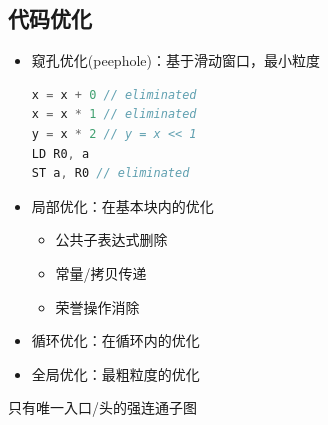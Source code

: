 \subsection{代码优化}
\begin{itemize}
	\item 窥孔优化(peephole)：基于滑动窗口，最小粒度
\begin{lstlisting}[language=c++]
x = x + 0 // eliminated
x = x * 1 // eliminated
y = x * 2 // y = x << 1
LD R0, a
ST a, R0 // eliminated
\end{lstlisting}
	\item 局部优化：在基本块内的优化
\begin{itemize}
	\item 公共子表达式删除
	\item 常量/拷贝传递
	\item 荣誉操作消除
\end{itemize}
	\item 循环优化：在循环内的优化
	\item 全局优化：最粗粒度的优化
\end{itemize}

\begin{definition}[循环(loop)]
只有唯一入口/头的强连通子图
\end{definition}

